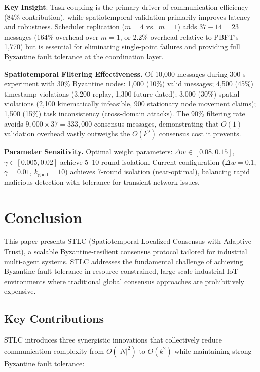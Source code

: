 \documentclass[manuscript,screen,review]{acmart}
\begin{document}
\textbf{Key Insight}: Task-coupling is the primary driver of communication efficiency (84\% contribution), while spatiotemporal validation primarily improves latency and robustness. Scheduler replication ($m=4$ vs.\ $m=1$) adds $37 - 14 = 23$ messages (164\% overhead over $m=1$, or 2.2\% overhead relative to PBFT's 1,770) but is essential for eliminating single-point failures and providing full Byzantine fault tolerance at the coordination layer.

\textbf{Spatiotemporal Filtering Effectiveness.} Of 10,000 messages during 300 s experiment with 30\% Byzantine nodes: 1,000 (10\%) valid messages; 4,500 (45\%) timestamp violations (3,200 replay, 1,300 future-dated); 3,000 (30\%) spatial violations (2,100 kinematically infeasible, 900 stationary node movement claims); 1,500 (15\%) task inconsistency (cross-domain attacks). The 90\% filtering rate avoids $9{,}000 \times 37 = 333{,}000$ consensus messages, demonstrating that $O(1)$ validation overhead vastly outweighs the $O(k^2)$ consensus cost it prevents.

\textbf{Parameter Sensitivity.} Optimal weight parameters: $\Delta w \in [0.08, 0.15]$, $\gamma \in [0.005, 0.02]$ achieve 5--10 round isolation. Current configuration ($\Delta w = 0.1$, $\gamma = 0.01$, $k_{\text{good}} = 10$) achieves 7-round isolation (near-optimal), balancing rapid malicious detection with tolerance for transient network issues.

\section{Conclusion}
\label{sec:conclusion}

This paper presents STLC (Spatiotemporal Localized Consensus with Adaptive Trust), a scalable Byzantine-resilient consensus protocol tailored for industrial multi-agent systems. STLC addresses the fundamental challenge of achieving Byzantine fault tolerance in resource-constrained, large-scale industrial IoT environments where traditional global consensus approaches are prohibitively expensive.

\subsection{Key Contributions}
\label{sec:contributions}

STLC introduces three synergistic innovations that collectively reduce communication complexity from $O(|N|^2)$ to $O(k^2)$ while maintaining strong Byzantine fault tolerance:
\end{document}
